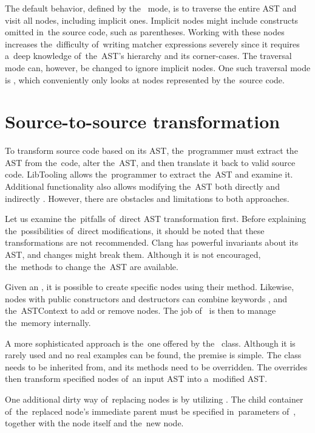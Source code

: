 The default behavior, defined by the~ mode, is to traverse 
the entire AST and visit all nodes, including implicit ones. 
Implicit nodes might include constructs omitted in~the source code, 
such as parentheses. 
Working with these nodes increases the~difficulty of~writing matcher 
expressions severely since it requires a~deep knowledge of~the~AST's 
hierarchy and its corner-cases. 
The traversal mode can, however, be changed to ignore implicit nodes. 
One such traversal mode is , 
which conveniently only looks at nodes represented by the~source code. 

\section{Source-to-source transformation}\label{chap:sts}

To transform source code based on its AST, the~programmer must extract 
the AST from the~code, alter the~AST, and then translate it back to valid 
source code. 
LibTooling allows the~programmer to extract the~AST and examine it. 
Additional functionality also allows modifying the~AST both directly 
and indirectly \citep{sourcetosource:online}. 
However, there are obstacles and limitations to both approaches. 

Let us examine the~pitfalls of~direct AST transformation first. 
Before explaining the~possibilities of~direct modifications, it 
should be noted that these transformations are not recommended. 
Clang has powerful invariants about its AST, and changes might 
break them. 
Although it is not encouraged, the~methods to change the~AST 
are available.

Given an , it is possible to create specific nodes
using their  method. 
Likewise, nodes with public constructors and destructors can combine 
keywords ,  and the~ASTContext 
to add or remove nodes. 
The job of~ is then to manage the~memory internally.

A more sophisticated approach is the~one offered 
by the~ class. 
Although it is rarely used and no real examples can be found, 
the premise is simple. 
The  class needs to be inherited from, 
and its  methods need to be overridden. 
The overrides then transform specified nodes of~an input AST 
into a~modified AST.

One additional dirty way of~replacing nodes is by utilizing 
. 
The child container of~the~replaced node's immediate parent must be 
specified in~parameters of~, together with 
the node itself and the~new node.

